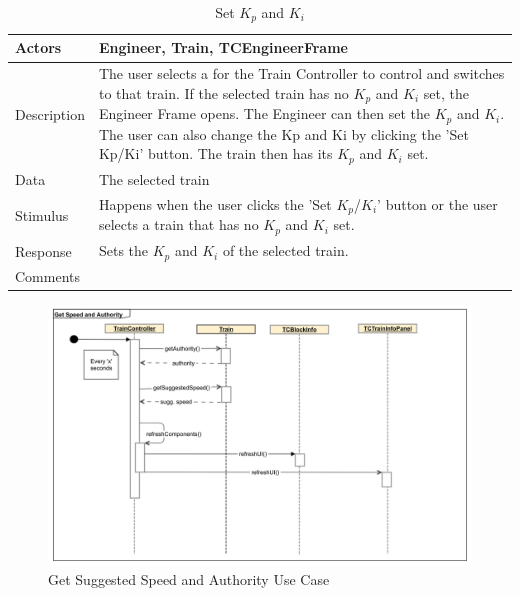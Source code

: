 \documentclass[]{article}
\begin{document}
\begin{table}[H]
	\centering
	\caption{Set $K_p$ and $K_i$}
	\begin{tabular}{|l|l|}
		\hline
		Actors & \parbox[t]{10cm}{Engineer, Train, TCEngineerFrame} \\ \hline
		Description & \parbox[t]{10cm}{The user selects a for the Train Controller to control and switches to that train. If the selected train has no $K_p$ and $K_i$ set, the Engineer Frame opens. The Engineer can then set the $K_p$ and $K_i$. The user can also change the Kp and Ki by clicking the 'Set Kp/Ki' button. The train then has its $K_p$ and $K_i$ set.} \\ \hline
		Data &  \parbox[t]{10cm}{The selected train} \\ \hline
		Stimulus &  \parbox[t]{10cm}{ Happens when the user clicks the 'Set $K_p$/$K_i$' button or the user selects a train that has no $K_p$ and $K_i$ set. } \\ \hline
		Response & \parbox[t]{10cm}{Sets the $K_p$ and $K_i$ of the selected train.  }\\ \hline
		Comments & \parbox[t]{10cm}{}  \\ \hline
	\end{tabular}
\end{table}

\begin{figure}[H]
	\centering
	\includegraphics[scale=.3]{tc_speedAndAuth_usecase}
	\caption{Get Suggested Speed and Authority Use Case}
\end{figure}
\end{document}

